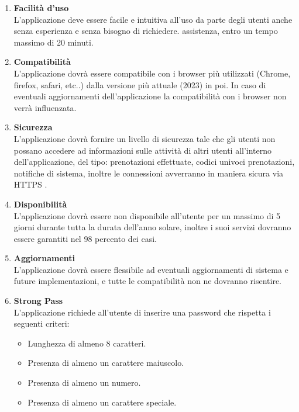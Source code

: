 \documentclass{article}
\begin{document}
\begin{enumerate}
        \item \textbf{Facilità d'uso}\label{sec:RNF5}\\
        L'applicazione deve essere facile e intuitiva all’uso da parte degli utenti anche senza esperienza e senza bisogno di richiedere. assistenza, entro un tempo massimo di 20 minuti.
        \item \textbf{Compatibilità}\label{sec:RNF6}\\
        L’applicazione dovrà essere compatibile con i browser più utilizzati (Chrome, firefox, safari, etc..) dalla versione più attuale (2023) in poi.
In caso di eventuali aggiornamenti dell’applicazione la compatibilità con i browser non verrà influenzata.

        \item \textbf{Sicurezza}\label{sec:RNF7}\\
        L’applicazione dovrà fornire un livello di sicurezza tale che gli utenti non possano accedere ad informazioni sulle attività di altri utenti all’interno dell’applicazione, del tipo: prenotazioni effettuate, codici univoci prenotazioni, notifiche di sistema, inoltre le connessioni avverranno in maniera sicura via HTTPS .
        \item \textbf{Disponibilità}\label{sec:RNF8}\\
        L’applicazione dovrà essere non disponibile all’utente per un massimo di 5 giorni durante tutta la durata dell’anno solare, inoltre i suoi servizi dovranno essere garantiti nel 98 percento dei casi.
        \item \textbf{Aggiornamenti}\label{sec:RNF9}\\
        L’applicazione dovrà essere flessibile ad eventuali aggiornamenti di sistema e future implementazioni, e tutte le compatibilità non ne dovranno risentire.
        \item \textbf{Strong Pass}\label{sec:RNF10}\\
        L’applicazione richiede all’utente di inserire una password che rispetta i seguenti criteri:
        \begin{itemize}
            \item Lunghezza di almeno 8 caratteri.
            \item Presenza di almeno un carattere maiuscolo.
            \item Presenza di almeno un numero.
            \item Presenza di almeno un carattere speciale.
        \end{itemize}
        
    \end{enumerate}
\end{document}

